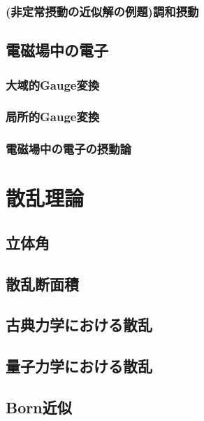 \documentclass{report}
\begin{document}
      \subsection{(非定常摂動の近似解の例題)調和摂動}
        
    \section{電磁場中の電子}
      
      \subsection{大域的Gauge変換}
        
      \subsection{局所的Gauge変換}
        
      \subsection{電磁場中の電子の摂動論}
        
  \chapter{散乱理論}
    \section{立体角}
      
    \section{散乱断面積}
      
    \section{古典力学における散乱}
      
    \section{量子力学における散乱}
      
    \section{Born近似}
      
\end{document}
